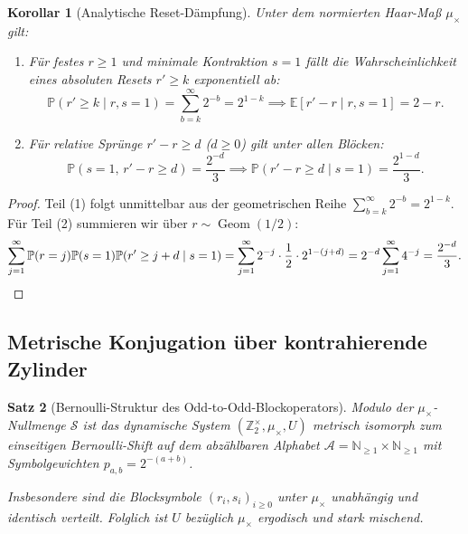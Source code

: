 \documentclass[11pt,reqno]{amsart}
\newtheorem{theorem}{Satz}[section]
\newtheorem{corollary}[theorem]{Korollar}
\theoremstyle{definition}
\theoremstyle{remark}
\numberwithin{equation}{section}
\begin{document}
\begin{corollary}[Analytische Reset-D\"ampfung]
\label{cor:reset_tail}
Unter dem normierten Haar-Ma\ss{} $\mu_\times$ gilt:
\begin{enumerate}
\item F\"ur festes $r \ge 1$ und minimale Kontraktion $s = 1$ f\"allt die Wahrscheinlichkeit eines absoluten Resets $r' \ge k$ exponentiell ab:
\begin{equation}
\mathbb{P}(r' \ge k \mid r, s = 1) = \sum_{b=k}^\infty 2^{-b} = 2^{1-k} \implies \mathbb{E}[r' - r \mid r, s = 1] = 2 - r.
\end{equation}
\item F\"ur relative Spr\"unge $r' - r \ge d$ ($d \ge 0$) gilt unter allen Bl\"ocken:
\begin{equation}
\mathbb{P}(s = 1, \, r' - r \ge d) = \frac{2^{-d}}{3} \implies \mathbb{P}(r' - r \ge d \mid s = 1) = \frac{2^{1-d}}{3}.
\end{equation}
\end{enumerate}
\end{corollary}

\begin{proof}
Teil (1) folgt unmittelbar aus der geometrischen Reihe $\sum_{b=k}^\infty 2^{-b} = 2^{1-k}$. 
F\"ur Teil (2) summieren wir \"uber $r \sim \operatorname{Geom}(1/2)$:
\begin{equation*}
\sum_{j=1}^\infty \mathbb{P}(r=j)\mathbb{P}(s=1)\mathbb{P}(r' \ge j+d \mid s=1) = \sum_{j=1}^\infty 2^{-j} \cdot \frac{1}{2} \cdot 2^{1-(j+d)} = 2^{-d} \sum_{j=1}^\infty 4^{-j} = \frac{2^{-d}}{3}. \qedhere
\end{equation*}
\end{proof}

\subsection{Metrische Konjugation \"uber kontrahierende Zylinder}

\begin{theorem}[Bernoulli-Struktur des Odd-to-Odd-Blockoperators]
\label{thm:block_bernoulli}
Modulo der $\mu_\times$-Nullmenge $\mathcal{S}$ ist das dynamische System $(\mathbb{Z}_2^\times, \mu_\times, U)$ metrisch isomorph zum einseitigen Bernoulli-Shift auf dem abz\"ahlbaren Alphabet $\mathcal{A} = \mathbb{N}_{\ge1} \times \mathbb{N}_{\ge1}$ mit Symbolgewichten $p_{a,b} = 2^{-(a+b)}$.

Insbesondere sind die Blocksymbole $(r_i, s_i)_{i \ge 0}$ unter $\mu_\times$ unabh\"angig und identisch verteilt. Folglich ist $U$ bez\"uglich $\mu_\times$ ergodisch und stark mischend.
\end{theorem}
\end{document}
